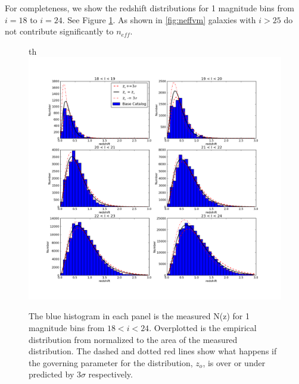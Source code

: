 \documentclass[]{article}
\begin{document}
{For completeness, we show the redshift distributions for 1 magnitude bins from $i=18$ to $i=24$.  See Figure \ref{fig:nofz18_24}.  As shown in \ref{fig:neffvm}
galaxies with $i > 25$ do not contribute significantly to $n_{eff}$. 

\begin{figure}{th}
\centering
\includegraphics[width=5in]{validation_figures/Nofz_18_24.png}
\caption{The blue histogram in each panel is the measured N(z) for 1 magnitude bins from $18<i<24$.  Overplotted is the empirical distribution from \citet{coil04} normalized to the area of the measured distribution.  The dashed and dotted red lines show what happens if the governing parameter for the \citet{coil04} distribution, $z_o$, is over
or under predicted by $3\sigma$ respectively.\label{fig:nofz18_24}}
\end{figure}
}
\end{document}
